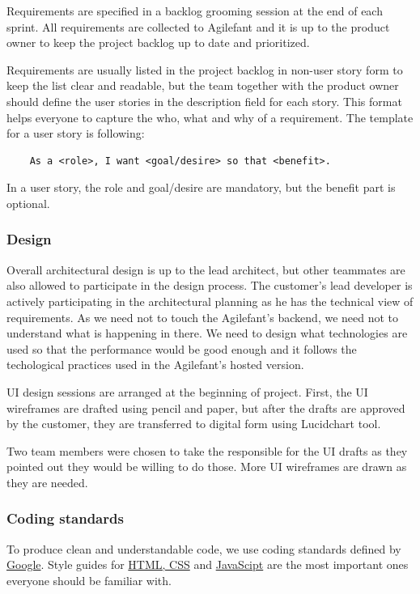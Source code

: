 Requirements are specified in a backlog grooming session at the end of each
sprint. All requirements are collected to Agilefant and it is up to the product
owner to keep the project backlog up to date and prioritized.

Requirements are usually listed in the project backlog in non-user story form to
keep the list clear and readable, but the team together with the product owner
should define the user stories in the description field for each story. This
format helps everyone to capture the who, what and why of a requirement. The
template for a user story is following:

\begin{verbatim}
    As a <role>, I want <goal/desire> so that <benefit>.
\end{verbatim}

In a user story, the role and goal/desire are mandatory, but the benefit part is 
optional.

\subsubsection{Design}

Overall architectural design is up to the lead architect, but other teammates
are also allowed to participate in the design process. The customer's lead
developer is actively participating in the architectural planning as he has the
technical view of requirements. As we need not to touch the Agilefant's backend,
we need not to understand what is happening in there. We need to design what
technologies are used so that the performance would be good enough and it
follows the techological practices used in the Agilefant's hosted version.

UI design sessions are arranged at the beginning of project. First, the UI
wireframes are drafted using pencil and paper, but after the drafts are approved
by the customer, they are transferred to digital form using Lucidchart tool.

Two team members were chosen to take the responsible for the UI drafts as they
pointed out they would be willing to do those. More UI wireframes are drawn as
they are needed.

\subsubsection{Coding standards}

To produce clean and understandable code, we use coding standards defined by
\href{http://code.google.com/p/google-styleguide/}{Google}. Style guides for
\href{http://google-styleguide.googlecode.com/svn/trunk/htmlcssguide.xml}{HTML,
CSS} and
\href{http://google-styleguide.googlecode.com/svn/trunk/javascriptguide.xml}{JavaScipt} are the most important ones everyone should be familiar with.

